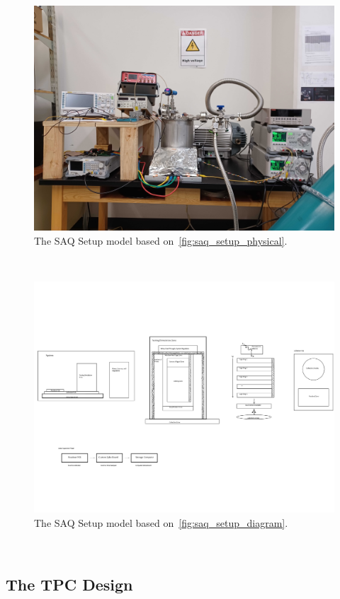 \begin{figure}[]
\centering
\includegraphics[width=\textwidth]{images/SAQ_physical_setup.jpg}
\caption{The SAQ Setup model based on~\ref{fig:saq_setup_physical}.}
\end{figure}~\label{fig:saq_setup_flatten}

\begin{figure}[]
\centering
\includegraphics[width=\textwidth]{images/SAQ_setup_diagram.pdf}
\caption{The SAQ Setup model based on~\ref{fig:saq_setup_diagram}.}
\end{figure}~\label{fig:saq_physical_setup_flatten}

\subsection{The TPC Design}

